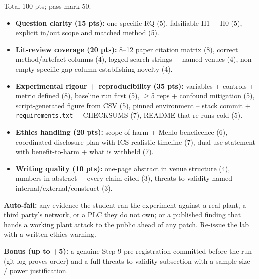 \documentclass[11pt,a4paper]{article}
\begin{document}
\begin{rubricbox}
Total 100 pts; pass mark 50.
\begin{itemize}\setlength{\itemsep}{1pt}
  \item \textbf{Question clarity (15 pts):} one specific RQ (5), falsifiable H1 + H0 (5), explicit in/out scope and matched method (5).
  \item \textbf{Lit-review coverage (20 pts):} 8--12 paper citation matrix (8), correct method/artefact columns (4), logged search strings + named venues (4), non-empty specific gap column establishing novelty (4).
  \item \textbf{Experimental rigour + reproducibility (35 pts):} variables + controls + metric defined (8), baseline run first (5), $\geq$5 reps + confound mitigation (5), script-generated figure from CSV (5), pinned environment -- stack commit + \texttt{requirements.txt} + CHECKSUMS (7), README that re-runs cold (5).
  \item \textbf{Ethics handling (20 pts):} scope-of-harm + Menlo beneficence (6), coordinated-disclosure plan with ICS-realistic timeline (7), dual-use statement with benefit-to-harm + what is withheld (7).
  \item \textbf{Writing quality (10 pts):} one-page abstract in venue structure (4), numbers-in-abstract + every claim cited (3), threats-to-validity named -- internal/external/construct (3).
\end{itemize}
\textbf{Auto-fail:} any evidence the student ran the experiment against a
real plant, a third party's network, or a PLC they do not own; or a
published finding that hands a working plant attack to the public ahead
of any patch. Re-issue the lab with a written ethics warning.

\vspace{1mm}
\textbf{Bonus (up to +5):} a genuine Step-9 pre-registration committed
before the run (git log proves order) and a full threats-to-validity
subsection with a sample-size / power justification.
\end{rubricbox}
\end{document}
